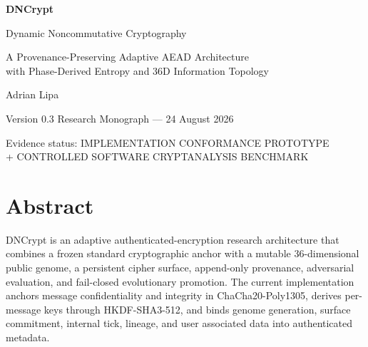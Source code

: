 \documentclass[11pt,oneside]{book}
\newcommand{\Dn}{\textsf{DNCrypt}}
\begin{document}
\frontmatter
\begin{titlepage}
\pagecolor{DNCink}\color{white}
\vspace*{18mm}
{\sffamily\bfseries\fontsize{42}{46}\selectfont DNCrypt\par}
\vspace{5mm}
{\sffamily\fontsize{19}{24}\selectfont Dynamic Noncommutative Cryptography\par}
\vspace{4mm}
{\sffamily\fontsize{15}{20}\selectfont A Provenance-Preserving Adaptive AEAD Architecture\\with Phase-Derived Entropy and 36D Information Topology\par}
\vfill
{}
\vfill
{\sffamily\large Adrian Lipa\par}
\vspace{2mm}
{\sffamily\small Version 0.3 Research Monograph --- 24 August 2026\par}
\vspace{8mm}
{\sffamily\footnotesize Evidence status: IMPLEMENTATION CONFORMANCE PROTOTYPE\\[1mm]+ CONTROLLED SOFTWARE CRYPTANALYSIS BENCHMARK\par}
\end{titlepage}
\nopagecolor\color{DNCink}

\chapter*{Abstract}
\Dn{} is an adaptive authenticated-encryption research architecture that combines a frozen standard cryptographic anchor with a mutable 36-dimensional public genome, a persistent cipher surface, append-only provenance, adversarial evaluation, and fail-closed evolutionary promotion. The current implementation anchors message confidentiality and integrity in ChaCha20-Poly1305, derives per-message keys through HKDF-SHA3-512, and binds genome generation, surface commitment, internal tick, lineage, and user associated data into authenticated metadata.
\end{document}
